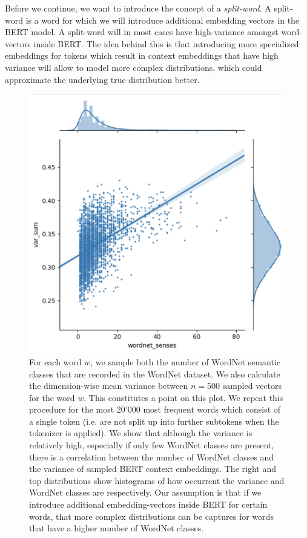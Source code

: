 \documentclass[a4paper,12pt,twoside,openright]{report}
\begin{document}
Before we continue, we want to introduce the concept of a \textit{split-word}. A split-word is a word for which we will introduce additional embedding vectors in the BERT model.
A split-word will in most cases have high-variance amongst word-vectors inside BERT.
The idea behind this is that introducing more specialized embeddings for tokens which result in context embeddings that have high variance will allow to model more complex distributions, which could approximate the underlying true distribution better.




\begin{figure}[H]
	\center
  \includegraphics[width=0.5\linewidth]{./assets/experiments/variance_in_BERT_embeddings.png}
  \caption{
  	For each word $w$, we sample both the number of WordNet semantic classes that are recorded in the WordNet dataset. We also calculate the dimension-wise mean variance between $n=500$ sampled vectors for the word $w$. 
  	This constitutes a point on this plot.
  	We repeat this procedure for the most 20'000 most frequent words which consist of a single token (i.e. are not split up into further subtokens when the tokenizer is applied).
	We show that although the variance is relatively high, especially if only few WordNet classes are present, there is a correlation between the number of WordNet classes and the variance of sampled BERT context embeddings.
	The right and top distributions show histograms of how occurrent the variance and WordNet classes are respectively.
	Our assumption is that if we introduce additional embedding-vectors inside BERT for certain words, that more complex distributions can be captures for words that have a higher number of WordNet classes.
  }
  \label{fig:BERT_variance}
\end{figure}
\end{document}
